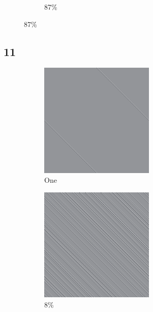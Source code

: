 \documentclass[12pt, fleqn]{report}                             %
\theoremstyle{break}                                            %
\begin{document}
\begin{figure}[ht!]
\begin{subfigure}[b]{0.4\linewidth}
          \caption{87\%}
        \end{subfigure}
      \end{figure}


      \clearpage
      \subsection{11}
      \begin{figure}[ht!]
        \centering
        \begin{subfigure}[b]{0.4\linewidth}
          \includegraphics[width=0.6\textwidth]{Images/11/a.png}
          \caption{One}
        \end{subfigure}
        \begin{subfigure}[b]{0.4\linewidth}
          \includegraphics[width=0.6\textwidth]{Images/11/b.png}
          \caption{8\%}
        \end{subfigure}
        \begin{subfigure}[b]{0.4\linewidth}

\end{subfigure}
\end{figure}
\end{document}

